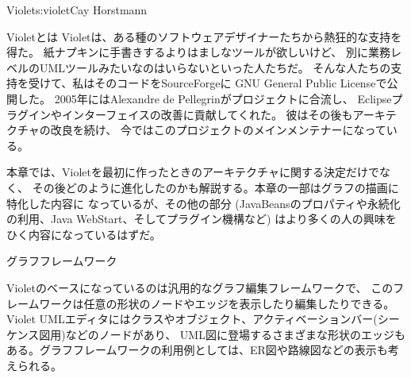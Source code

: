 \begin{aosachapter}{Violet}{s:violet}{Cay Horstmann}
\begin{aosasect1}{Violetとは}
Violetは、ある種のソフトウェアデザイナーたちから熱狂的な支持を得た。
紙ナプキンに手書きするよりはましなツールが欲しいけど、
別に業務レベルのUMLツールみたいなのはいらないといった人たちだ。
そんな人たちの支持を受けて、私はそのコードをSourceForgeに
GNU General Public Licenseで公開した。
2005年にはAlexandre de Pellegrinがプロジェクトに合流し、
Eclipseプラグインやインターフェイスの改善に貢献してくれた。
彼はその後もアーキテクチャの改良を続け、
今ではこのプロジェクトのメインメンテナーになっている。

本章では、Violetを最初に作ったときのアーキテクチャに関する決定だけでなく、
その後どのように進化したのかも解説する。本章の一部はグラフの描画に特化した内容に
なっているが、その他の部分
(JavaBeansのプロパティや永続化の利用、Java WebStart、そしてプラグイン機構など)
はより多くの人の興味をひく内容になっているはずだ。

\end{aosasect1}

\begin{aosasect1}{グラフフレームワーク}

Violetのベースになっているのは汎用的なグラフ編集フレームワークで、
このフレームワークは任意の形状のノードやエッジを表示したり編集したりできる。
Violet UMLエディタにはクラスやオブジェクト、アクティベーションバー(シーケンス図用)などのノードがあり、
UML図に登場するさまざまな形状のエッジもある。グラフフレームワークの利用例としては、ER図や路線図などの表示も考えられる。


\end{aosasect1}
\end{aosachapter}
